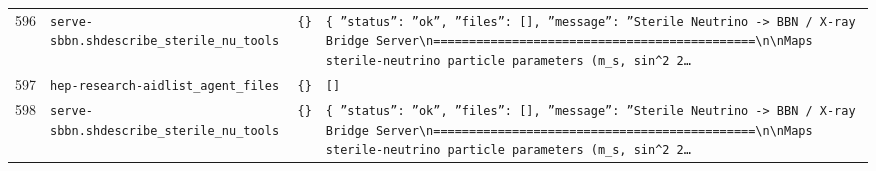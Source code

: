 \documentclass[11pt,a4paper]{article}
\begin{document}
\begin{longtable}{@{}p{}p{}p{}p{}@{}}
596 & \texttt{serve-sbbn.sh}\newline\texttt{describe\_\allowbreak{}sterile\_\allowbreak{}nu\_\allowbreak{}tools} & \texttt{\{\}\allowbreak{}} & \texttt{\{   ''status'':\allowbreak{} ''ok'',\allowbreak{}   ''files'':\allowbreak{} []\allowbreak{},\allowbreak{}   ''message'':\allowbreak{} ''Sterile Neutrino -\textgreater{}\allowbreak{} BBN /\allowbreak{} X-ray Bridge Server\textbackslash{}\allowbreak{}n=\allowbreak{}=\allowbreak{}=\allowbreak{}=\allowbreak{}=\allowbreak{}=\allowbreak{}=\allowbreak{}=\allowbreak{}=\allowbreak{}=\allowbreak{}=\allowbreak{}=\allowbreak{}=\allowbreak{}=\allowbreak{}=\allowbreak{}=\allowbreak{}=\allowbreak{}=\allowbreak{}=\allowbreak{}=\allowbreak{}=\allowbreak{}=\allowbreak{}=\allowbreak{}=\allowbreak{}=\allowbreak{}=\allowbreak{}=\allowbreak{}=\allowbreak{}=\allowbreak{}=\allowbreak{}=\allowbreak{}=\allowbreak{}=\allowbreak{}=\allowbreak{}=\allowbreak{}=\allowbreak{}=\allowbreak{}=\allowbreak{}=\allowbreak{}=\allowbreak{}=\allowbreak{}=\allowbreak{}=\allowbreak{}=\allowbreak{}=\allowbreak{}\textbackslash{}\allowbreak{}n\textbackslash{}\allowbreak{}nMaps sterile-neutrino particle parameters (m\_\allowbreak{}s,\allowbreak{} sin\textasciicircum{}\allowbreak{}2 2\ldots{}\allowbreak{}} \\
597 & \texttt{hep-research-aid}\newline\texttt{list\_\allowbreak{}agent\_\allowbreak{}files} & \texttt{\{\}\allowbreak{}} & \texttt{[]\allowbreak{}} \\
598 & \texttt{serve-sbbn.sh}\newline\texttt{describe\_\allowbreak{}sterile\_\allowbreak{}nu\_\allowbreak{}tools} & \texttt{\{\}\allowbreak{}} & \texttt{\{   ''status'':\allowbreak{} ''ok'',\allowbreak{}   ''files'':\allowbreak{} []\allowbreak{},\allowbreak{}   ''message'':\allowbreak{} ''Sterile Neutrino -\textgreater{}\allowbreak{} BBN /\allowbreak{} X-ray Bridge Server\textbackslash{}\allowbreak{}n=\allowbreak{}=\allowbreak{}=\allowbreak{}=\allowbreak{}=\allowbreak{}=\allowbreak{}=\allowbreak{}=\allowbreak{}=\allowbreak{}=\allowbreak{}=\allowbreak{}=\allowbreak{}=\allowbreak{}=\allowbreak{}=\allowbreak{}=\allowbreak{}=\allowbreak{}=\allowbreak{}=\allowbreak{}=\allowbreak{}=\allowbreak{}=\allowbreak{}=\allowbreak{}=\allowbreak{}=\allowbreak{}=\allowbreak{}=\allowbreak{}=\allowbreak{}=\allowbreak{}=\allowbreak{}=\allowbreak{}=\allowbreak{}=\allowbreak{}=\allowbreak{}=\allowbreak{}=\allowbreak{}=\allowbreak{}=\allowbreak{}=\allowbreak{}=\allowbreak{}=\allowbreak{}=\allowbreak{}=\allowbreak{}=\allowbreak{}=\allowbreak{}\textbackslash{}\allowbreak{}n\textbackslash{}\allowbreak{}nMaps sterile-neutrino particle parameters (m\_\allowbreak{}s,\allowbreak{} sin\textasciicircum{}\allowbreak{}2 2\ldots{}\allowbreak{}} \\

\end{longtable}
\end{document}
